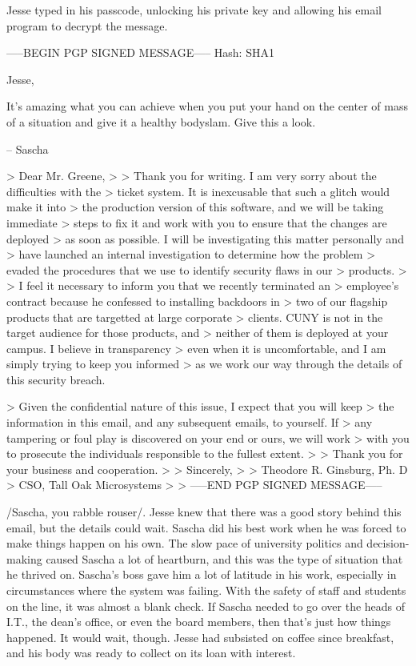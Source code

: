 Jesse typed in his passcode, unlocking his private key and allowing his email program to decrypt the message.

	-----BEGIN PGP SIGNED MESSAGE-----
	Hash: SHA1
	
	Jesse,
	
	It's amazing what you can achieve when you put your hand on the center of mass of a situation and give it a healthy bodyslam.  Give this a look.
	
	-- Sascha
	
	> Dear Mr. Greene,
	>
	> Thank you for writing.  I am very sorry about the difficulties with the
	> ticket system.  It is inexcusable that such a glitch would make it into
	> the production version of this software, and we will be taking immediate
	> steps to fix it and work with you to ensure that the changes are deployed
	> as soon as possible.  I will be investigating this matter personally and
	> have launched an internal investigation to determine how the problem
	> evaded the procedures that we use to identify security flaws in our 
	> products.
	>
	> I feel it necessary to inform you that we recently terminated an
	> employee's contract because he confessed to installing backdoors in
	> two of our flagship products that are targetted at large corporate
	> clients.  CUNY is not in the target audience for those products, and
	> neither of them is deployed at your campus.  I believe in transparency
	> even when it is uncomfortable, and I am simply trying to keep you informed
	> as we work our way through the details of this security breach.
	
	> Given the confidential nature of this issue, I expect that you will keep
	> the information in this email, and any subsequent emails, to yourself.  If
	> any tampering or foul play is discovered on your end or ours, we will work
	> with you to prosecute the individuals responsible to the fullest extent.
	>
	> Thank you for your business and cooperation.
	>
	> Sincerely,
	>
	> Theodore R. Ginsburg, Ph. D
	> CSO, Tall Oak Microsystems
	>
	>
	-----END PGP SIGNED MESSAGE-----

/Sascha, you rabble rouser/.  Jesse knew that there was a good story behind this email, but the details could wait.  Sascha did his best work when he was forced to make things happen on his own.  The slow pace of university politics and decision-making caused Sascha a lot of heartburn, and this was the type of situation that he thrived on.  Sascha's boss gave him a lot of latitude in his work, especially in circumstances where the system was failing.  With the safety of staff and students on the line, it was almost a blank check.  If Sascha needed to go over the heads of I.T., the dean's office, or even the board members, then that's just how things happened.  It would wait, though.  Jesse had subsisted on coffee since breakfast, and his body was ready to collect on its loan with interest.


